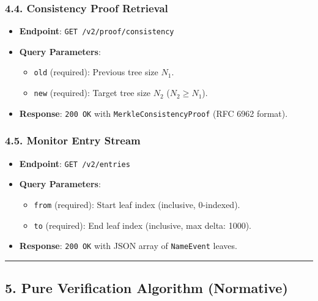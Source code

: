 \documentclass[
]{article}
\providecommand{\tightlist}{%
  \setlength{\itemsep}{0pt}\setlength{\parskip}{0pt}}
\begin{document}
\hypertarget{consistency-proof-retrieval}{%
\subsubsection{4.4. Consistency Proof
Retrieval}\label{consistency-proof-retrieval}}

\begin{itemize}
\tightlist
\item
  \textbf{Endpoint}: \texttt{GET\ /v2/proof/consistency}
\item
  \textbf{Query Parameters}:

  \begin{itemize}
  \tightlist
  \item
    \texttt{old} (required): Previous tree size \(N_1\).
  \item
    \texttt{new} (required): Target tree size \(N_2\) (\(N_2 \ge N_1\)).
  \end{itemize}
\item
  \textbf{Response}: \texttt{200\ OK} with
  \texttt{MerkleConsistencyProof} (RFC 6962 format).
\end{itemize}

\hypertarget{monitor-entry-stream}{%
\subsubsection{4.5. Monitor Entry Stream}\label{monitor-entry-stream}}

\begin{itemize}
\tightlist
\item
  \textbf{Endpoint}: \texttt{GET\ /v2/entries}
\item
  \textbf{Query Parameters}:

  \begin{itemize}
  \tightlist
  \item
    \texttt{from} (required): Start leaf index (inclusive, 0-indexed).
  \item
    \texttt{to} (required): End leaf index (inclusive, max delta: 1000).
  \end{itemize}
\item
  \textbf{Response}: \texttt{200\ OK} with JSON array of
  \texttt{NameEvent} leaves.
\end{itemize}

\begin{center}\rule{0.5\linewidth}{0.5pt}\end{center}

\hypertarget{pure-verification-algorithm-normative}{%
\subsection{5. Pure Verification Algorithm
(Normative)}\label{pure-verification-algorithm-normative}}
\end{document}
